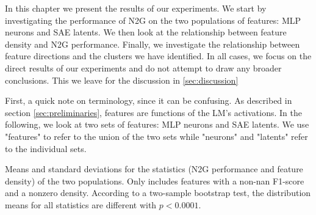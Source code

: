 In this chapter we present the results of our experiments.
We start by investigating the performance of N2G on the two populations of features: MLP neurons and SAE latents.
We then look at the relationship between feature density and N2G performance.
Finally, we investigate the relationship between feature directions and the clusters we have identified.
In all cases, we focus on the direct results of our experiments and do not attempt to draw any broader conclusions.
This we leave for the discussion in \autoref{sec:discussion}

First, a quick note on terminology, since it can be confusing.
As described in section \ref{sec:preliminaries}, features are functions of the LM's activations.
In the following, we look at two sets of features: MLP neurons and SAE latents.
We use "features" to refer to the union of the two sets while "neurons" and "latents" refer to the individual sets.



\begin{table}[ht]
    \centering
    
    \caption{Means and standard deviations for the statistics (N2G performance and feature density) of the two populations. Only includes features with a non-nan F1-score and a nonzero density. According to a two-sample bootstrap test, the distribution means for all statistics are different with $p<0.0001$.}
    \label{tab:distributions}
\end{table}

